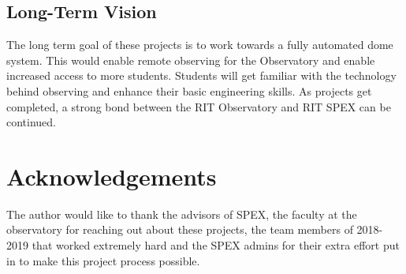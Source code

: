 \documentclass[conference]{IEEEtran} %
\begin{document}
\subsection{Long-Term Vision}
\label{sec:vision}
The long term goal of these projects is to work towards a fully automated dome system. This would enable remote observing for the Observatory and enable increased access to more students.
  Students will get familiar with the technology behind observing and enhance their basic engineering skills. As projects get completed, a strong bond between the RIT Observatory and RIT SPEX can be continued.

\section*{Acknowledgements}
The author would like to thank the advisors of SPEX, the faculty at the
observatory for reaching out about these projects, the team members of 2018-2019 that worked extremely hard and the
SPEX admins for their extra effort put in to make this project
process possible.
\end{document}
